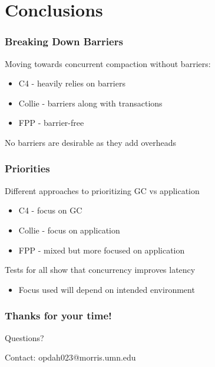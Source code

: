\documentclass{beamer}
\newcommand{\linespace}{\vskip 0.25cm}
\begin{document}
\begin{frame}
\end{frame}



\section[Conclusions]{Conclusions}

\begin{frame}

\frametitle{Breaking Down Barriers}

Moving towards concurrent compaction without barriers:
\begin{itemize}
\item C4 - heavily relies on barriers
\item Collie - barriers along with transactions
\item FPP - barrier-free
\end{itemize}

\linespace
\linespace

No barriers are desirable as they add overheads

\end{frame}

\begin{frame}

\frametitle{Priorities}

Different approaches to prioritizing GC vs application
\begin{itemize}
\item C4 - focus on GC
\item Collie - focus on application
\item FPP - mixed but more focused on application
\end{itemize}

\linespace
\linespace

Tests for all show that concurrency improves latency
\begin{itemize}
\item Focus used will depend on intended environment
\end{itemize}

\end{frame}

\begin{frame}
	\frametitle{Thanks for your time!}
	
	\begin{center}
	{\huge Questions?}
	\end{center}	
	
	\linespace
	\linespace	
	
	\begin{center}
	Contact: opdah023@morris.umn.edu
	\end{center}
	
\end{frame}
\end{document}
